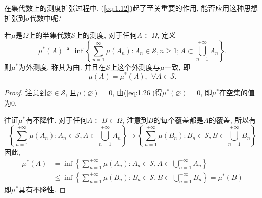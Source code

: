 在集代数上的测度扩张过程中, (\ref{eq:1.12})起了至关重要的作用, 能否应用这种思想扩张到$\sigma$代数中呢?
\begin{lemma}
	若$\mu$是$\Omega$上的半集代数$\mathscr{S}$上的测度, 对于任何$A\subset\Omega$, 定义
	\begin{equation}\label{eq:1.26}
		\mu^*(A) \triangleq \inf\left\{ \sum_{n=1}^{\infty}\mu(A_n):A_n\in\mathscr{S},n\geqslant 1; A\subset \bigcup_{n=1}^{+\infty}A_n \right\}.
	\end{equation}
	则$\mu^*$为外测度, 称其为由.
	并且在$\mathscr{S}$上这个外测度与$\mu$一致, 即\begin{equation}
		\mu(A) = \mu^*(A),~~\forall A\in\mathscr{S}.\label{eq:1.27}
	\end{equation}
\end{lemma}
\begin{proof}
	注意到$\varnothing\in\mathscr{S}$, 且$\mu(\varnothing) = 0$, 由(\ref{eq:1.26})得$\mu^*(\varnothing) = 0$, 即$\mu^*$在空集的值为$0$.

	往证$\mu^*$有不降性. 对于任何$A\subset B\subset \Omega$, 注意到$B$的每个覆盖都是$A$的覆盖, 所以有
	\begin{equation}
		\left\{ \sum_{n=1}^{+\infty}\mu(A_n):A_n\in\mathscr{S},A\subset\bigcup_{n=1}^{+\infty}A_n  \right\}
		\supset 	\left\{ \sum_{n=1}^{+\infty}\mu(B_n):B_n\in\mathscr{S},B\subset\bigcup_{n=1}^{+\infty}B_n  \right\}
	\end{equation}
	因此, \begin{align}
		\mu^*(A) &= \inf\left\{ \sum_{n=1}^{+\infty}\mu(A_n):A_n\in\mathscr{S},A\subset\bigcup_{n=1}^{+\infty}A_n  \right\}\nonumber\\
		&\leqslant 	\inf\left\{ \sum_{n=1}^{+\infty}\mu(B_n):B_n\in\mathscr{S},B\subset\bigcup_{n=1}^{+\infty}B_n  \right\} = \mu^*(B)	
	\end{align}
	即$\mu^*$具有不降性.


\end{proof}
